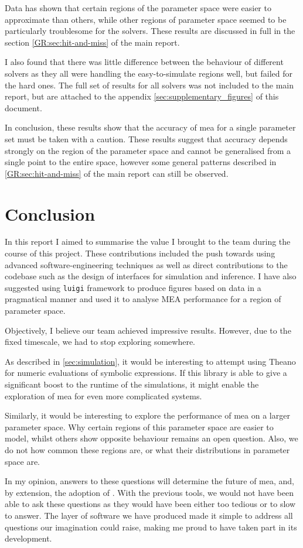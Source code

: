 Data has shown that certain regions of the parameter space were easier to approximate than others, while other regions of parameter space seemed to be particularly troublesome for the solvers. 
These results are discussed in full in the section \autoref*{GR:sec:hit-and-miss} of the main report.

I also found that there was little difference between the behaviour of different solvers as they all were handling the easy-to-simulate regions well, but failed for the hard ones.
The full set of results for all solvers was not included to the main report, but are attached to the appendix \autoref{sec:supplementary_figures} of this document.

In conclusion, these results show that the accuracy of \gls{mea} for a single parameter set must be taken with a caution. These results suggest that accuracy depends strongly on the region of the parameter space and cannot be generalised from a single point to the entire space, however some general patterns described in \autoref*{GR:sec:hit-and-miss} of the main report can still be observed.

\section{Conclusion}

In this report I aimed to summarise the value I brought to the team during the course of this project.
These contributions included the push towards using advanced software-engineering techniques as well as direct contributions to the codebase such as the design of interfaces for simulation and inference.
I have also suggested using \verb"luigi" framework to produce figures based on data in a pragmatical manner and
used it to analyse MEA performance for a region of parameter space.

Objectively, I believe our team achieved impressive results.
However, due to the fixed timescale, we had to stop exploring somewhere.

As described in \autoref{sec:simulation}, it would be interesting to attempt using Theano for numeric evaluations of symbolic expressions.
If this library is able to give a significant boost to the runtime of the simulations, it might enable the exploration of \gls{mea} for even more complicated systems.

Similarly, it would be interesting to explore the performance of \gls{mea} on a larger parameter space. Why certain regions of this parameter space are easier to model, whilst others show opposite behaviour remains an open question.
Also, we do not how common these regions are, or what their distributions in parameter space are.

In my opinion, answers to these questions will determine the future of \gls{mea}, and, by extension, the adoption of \means.
With the previous tools, we would not have been able to ask these questions as they would have been either too tedious or to slow to answer.
The layer of software we have produced made it simple to address all questions our imagination could raise, making me proud to have taken part in its development.